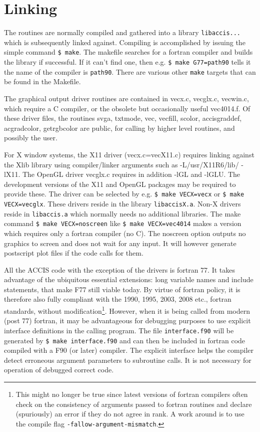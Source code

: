 \documentclass[12pt]{article}
\begin{document}
\section{Linking}

The routines are normally compiled and gathered into a library
\verb!libaccis...! which is subsequently linked against. Compiling is
accomplished by issuing the simple command \verb!$ make!. The makefile
searches for a fortran compiler and builds the library if
successful. If it can't find one, then e.g. \verb!$ make G77=path90!
tells it the name of the compiler is \verb!path90!. There are various
other \verb!make! targets that can be found in the Makefile.

The graphical output driver routines are contained in vecx.c,
vecglx.c, vecwin.c, which require a C compiler, or the obsolete but
occasionally useful vec4014.f. Of these driver files, the routines
svga, txtmode, vec, vecfill, scolor, accisgraddef, acgradcolor,
getrgbcolor are public, for calling by higher level routines, and
possibly the user.

For X window systems, the X11 driver (vecx.c=vecX11.c) requires
linking against the Xlib library using compiler/linker arguments such
as -L/usr/X11R6/lib/ -lX11.  The OpenGL driver vecglx.c requires in
addition -lGL and -lGLU. The development versions of the X11 and
OpenGL packages may be required to provide these. The driver can be
selected by e.g. \verb!$ make VECX=vecx! or \verb!$ make VECX=vecglx!.
These drivers reside in the library \verb!libaccisX.a!.  Non-X drivers
reside in \verb!libaccis.a! which normally needs no additional
libraries.  The make command \verb!$ make VECX=noscreen!  like
\verb!$ make VECX=vec4014!  makes a version which requires only a
fortran compiler (no C). The noscreen option outputs no graphics to
screen and does not wait for any input. It will however generate
postscript plot files if the code calls for them.


All the ACCIS code with the exception of the drivers is fortran 77.
It takes advantage of the ubiquitous essential extensions: long
variable names and include statements, that make F77 still viable
today.  By virtue of fortran policy, it is therefore also fully
compliant with the 1990, 1995, 2003, 2008 etc., fortran standards,
without modification\footnote{This might no longer be true since
  latest versions of fortran compilers often check on the consistency
  of arguments passed to fortran routines and declare (spuriously) an
  error if they do not agree in rank. A work around is to use the
  compile flag \texttt{-fallow-argument-mismatch}.}. However, when it is being
called from modern (post 77) fortran, it may be advantageous for
debugging purposes to use explicit interface definitions in the
calling program. The file \verb!interface.f90! will be generated by
\verb!$ make interface.f90!  and can then be included in fortran code
compiled with a F90 (or later) compiler. The explicit interface helps
the compiler detect erroneous argument parameters to subroutine
calls. It is not necessary for operation of debugged correct code.
\end{document}
